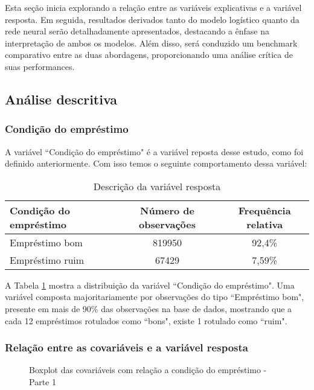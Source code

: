 Esta seção inicia explorando a relação entre as variáveis explicativas e a variável resposta. 
Em seguida, resultados derivados tanto do modelo logístico quanto da rede neural serão detalhadamente apresentados, 
destacando a ênfase na interpretação de ambos os modelos. Além disso, será conduzido um benchmark comparativo
 entre as duas abordagens, proporcionando uma análise crítica de suas performances.

 \subsection{Análise descritiva}

\subsubsection{Condição do empréstimo}

A variável ``Condição do empréstimo" é a variável reposta desse estudo, como foi definido anteriormente.
Com isso temos o seguinte comportamento dessa variável:

\begin{table}[H]
  \centering
  \begin{tabular}{lcc}
    \hline
    \textbf{Condição do empréstimo} & \textbf{Número de observações} & \textbf{Frequência relativa} \\ \hline
    Empréstimo bom  & 819950 & 92,4\% \\
    Empréstimo ruim & 67429  & 7,59\% \\ \hline
  \end{tabular}
  \caption{Descrição da variável resposta}
  \label{tab:freq_var_res}
\end{table}

A Tabela \ref{tab:freq_var_res} mostra a distribuição da variável ``Condição do empréstimo". Uma variável composta majoritariamente 
por observações do tipo ``Empréstimo bom", presente em mais de 90\% das observações na base de dados, mostrando
que a cada 12 empréstimos rotulados como ``bons", existe 1 rotulado como ``ruim". 

\subsubsection{Relação entre as covariáveis e a variável resposta}

\begin{figure}[H]
  \centering
  \vspace{.5cm}
  \vspace{.5cm}
  
  \label{fig:exp_boxplot1}
  \caption{Boxplot das covariáveis com relação a condição do empréstimo - Parte 1}
  
\end{figure}

